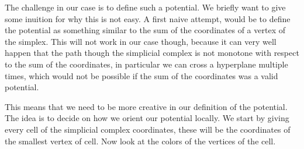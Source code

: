 The challenge in our case is to define such a potential. We briefly want to give some inuition for why this is not easy. A first naive attempt, would be to define the potential as something similar to the sum of the coordinates of a vertex of the simplex. This will not work in our case though, because it can very well happen that the path though the simplicial complex is not monotone with respect to the sum of the coordinates, in particular we can cross a hyperplane multiple times, which would not be possible if the sum of the coordinates was a valid potential.

This means that we need to be more creative in our definition of the potential. The idea is to decide on how we orient our potential locally. We start by giving every cell of the simplicial complex coordinates, these will be the coordinates of the smallest vertex of cell. Now look at the colors of the vertices of the cell.